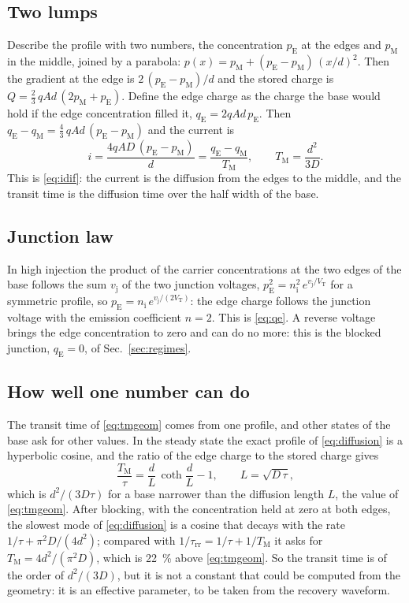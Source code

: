 \documentclass[10pt,a4paper]{scrartcl}
\newcommand{\taurr}{\tau_\mathrm{rr}}
\newcommand{\TM}{T_\mathrm{M}}
\newcommand{\qE}{q_\mathrm{E}}
\newcommand{\qM}{q_\mathrm{M}}
\newcommand{\vj}{v_\mathrm{j}}
\newcommand{\VT}{V_\mathrm{T}}
\begin{document}
\subsection*{Two lumps}
Describe the profile with two numbers, the concentration $p_\mathrm{E}$ at the edges and $p_\mathrm{M}$ in the middle, joined by a parabola: $p(x) = p_\mathrm{M} + (p_\mathrm{E}-p_\mathrm{M})\,(x/d)^2$. Then the gradient at the edge is $2\,(p_\mathrm{E}-p_\mathrm{M})/d$ and the stored charge is $Q = \tfrac{2}{3}\,qAd\,(2p_\mathrm{M}+p_\mathrm{E})$. Define the edge charge as the charge the base would hold if the edge concentration filled it, $\qE = 2qAd\,p_\mathrm{E}$. Then $\qE - \qM = \tfrac43\,qAd\,(p_\mathrm{E}-p_\mathrm{M})$ and the current is
\begin{equation}
i = \frac{4qAD\,(p_\mathrm{E}-p_\mathrm{M})}{d} = \frac{\qE-\qM}{\TM} , \qquad \TM = \frac{d^2}{3D} .
\label{eq:tmgeom}
\end{equation}
This is \eqref{eq:idif}: the current is the diffusion from the edges to the middle, and the transit time is the diffusion time over the half width of the base.

\subsection*{Junction law}
In high injection the product of the carrier concentrations at the two edges of the base follows the sum $\vj$ of the two junction voltages, $p_\mathrm{E}^2 = n_\mathrm{i}^2\,e^{\vj/\VT}$ for a symmetric profile, so $p_\mathrm{E} = n_\mathrm{i}\,e^{\vj/(2\VT)}$: the edge charge follows the junction voltage with the emission coefficient $n = 2$. This is \eqref{eq:qe}. A reverse voltage brings the edge concentration to zero and can do no more: this is the blocked junction, $\qE = 0$, of Sec.~\ref{sec:regimes}.

\subsection*{How well one number can do}
The transit time of \eqref{eq:tmgeom} comes from one profile, and other states of the base ask for other values. In the steady state the exact profile of \eqref{eq:diffusion} is a hyperbolic cosine, and the ratio of the edge charge to the stored charge gives
\begin{equation}
\frac{\TM}{\tau} = \frac{d}{L}\,\coth\frac{d}{L} - 1 , \qquad L = \sqrt{D\,\tau} ,
\label{eq:tmstatic}
\end{equation}
which is $d^2/(3D\tau)$ for a base narrower than the diffusion length $L$, the value of \eqref{eq:tmgeom}. After blocking, with the concentration held at zero at both edges, the slowest mode of \eqref{eq:diffusion} is a cosine that decays with the rate $1/\tau + \pi^2 D/(4d^2)$; compared with $1/\taurr = 1/\tau + 1/\TM$ it asks for $\TM = 4d^2/(\pi^2 D)$, which is \SI{22}{\percent} above \eqref{eq:tmgeom}. So the transit time is of the order of $d^2/(3D)$, but it is not a constant that could be computed from the geometry: it is an effective parameter, to be taken from the recovery waveform.
\end{document}
